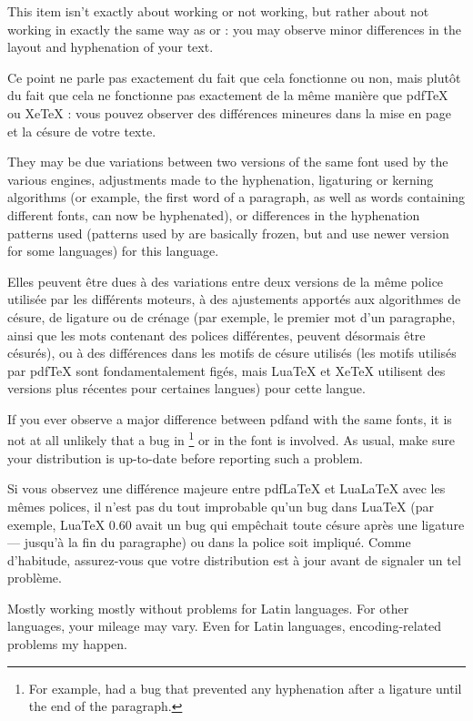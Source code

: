 \documentclass{lltxdoc}
\begin{document}
This item isn't exactly about working or not working, but rather about not
working in exactly the same way as \pdftex or \xetex: you may observe minor
differences in the layout and hyphenation of your text.

Ce point ne parle pas exactement du fait que cela fonctionne ou non, mais plutôt du fait que cela ne fonctionne pas exactement de la même manière que pdfTeX ou XeTeX : vous pouvez observer des différences mineures dans la mise en page et la césure de votre texte.

They may be due variations between two versions of the same font used by the
various engines, adjustments made to the hyphenation, ligaturing or kerning
algorithms (or example, the first word of a paragraph, as well as words
containing different fonts, can now be hyphenated), or differences in the
hyphenation patterns used (patterns used by \pdftex are basically frozen, but
\luatex and \xetex use newer version for some languages) for this language.

Elles peuvent être dues à des variations entre deux versions de la même police utilisée par les différents moteurs, à des ajustements apportés aux algorithmes de césure, de ligature ou de crénage (par exemple, le premier mot d'un paragraphe, ainsi que les mots contenant des polices différentes, peuvent désormais être césurés), ou à des différences dans les motifs de césure utilisés (les motifs utilisés par pdfTeX sont fondamentalement figés, mais LuaTeX et XeTeX utilisent des versions plus récentes pour certaines langues) pour cette langue.

If you ever observe a major difference between pdf\latex and \lualatex with
the same fonts, it is not at all unlikely that a bug in \luatex\footnote{For
  example,  had a bug that prevented any hyphenation after a
  \code{-{}-{}-} ligature until the end of the paragraph.} or in the font is
involved. As usual, make sure your distribution is up-to-date before reporting
such a problem.

Si vous observez une différence majeure entre pdfLaTeX et LuaLaTeX avec les mêmes polices, il n'est pas du tout improbable qu'un bug dans LuaTeX (par exemple, LuaTeX 0.60 avait un bug qui empêchait toute césure après une ligature --- jusqu'à la fin du paragraphe) ou dans la police soit impliqué. Comme d'habitude, assurez-vous que votre distribution est à jour avant de signaler un tel problème.

Mostly working mostly without problems for Latin languages. For other
languages, your mileage may vary. Even for Latin languages, encoding-related
problems my happen.
\end{document}
